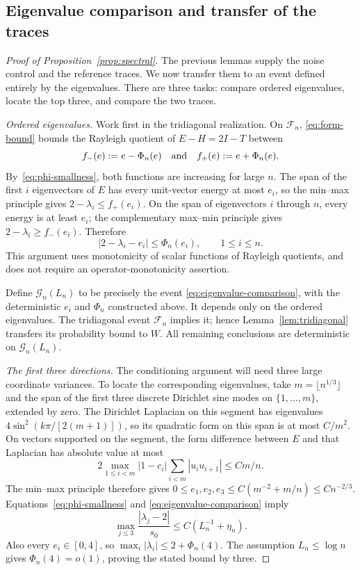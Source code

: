 \subsection{Eigenvalue comparison and transfer of the traces}

\begin{proof}[Proof of Proposition~\ref{prop:spectral}]
The previous lemmas supply the noise control and the reference traces.
We now transfer them to an event defined entirely by the eigenvalues.
There are three tasks: compare ordered eigenvalues, locate the top three,
and compare the two traces.

\smallskip\noindent\emph{Ordered eigenvalues.}
Work first in the tridiagonal realization. On $\mathcal F_n$,
\eqref{eq:form-bound} bounds the Rayleigh quotient of $E-H=2I-T$ between
\[
 f_-(e):=e-\Phi_n(e)\quad\hbox{and}\quad f_+(e):=e+\Phi_n(e).
\]
By~\eqref{eq:phi-smallness}, both functions are increasing for large $n$.
The span of the first $i$ eigenvectors of $E$ has every unit-vector
energy at most $e_i$, so the min--max principle gives
$2-\lambda_i\le f_+(e_i)$.  On the span of eigenvectors $i$ through
$n$, every energy is at least $e_i$; the complementary max--min
principle gives $2-\lambda_i\ge f_-(e_i)$.  Therefore
\begin{equation}
 |2-\lambda_i-e_i|\le\Phi_n(e_i),\qquad 1\le i\le n.
 \label{eq:eigenvalue-comparison}
\end{equation}
This argument uses monotonicity of scalar functions of Rayleigh
quotients, and does not require an operator-monotonicity assertion.

Define $\mathcal G_n(L_n)$ to be precisely the event
\eqref{eq:eigenvalue-comparison}, with the deterministic $e_i$ and
$\Phi_n$ constructed above.  It depends only on the ordered eigenvalues.
The tridiagonal event $\mathcal F_n$ implies it; hence
Lemma~\ref{lem:tridiagonal} transfers its probability bound to $W$.
All remaining conclusions are deterministic on $\mathcal G_n(L_n)$.

\smallskip\noindent\emph{The first three directions.}
The conditioning argument will need three large coordinate variances.
To locate the corresponding eigenvalues, take
$m=\lfloor n^{1/3}\rfloor$ and the span of the first three discrete
Dirichlet sine modes on $\{1,\ldots,m\}$, extended by zero.
The Dirichlet Laplacian on this segment has eigenvalues
$4\sin^2(k\pi/[2(m+1)])$, so its quadratic form on this span is at most
$C/m^2$.  On vectors supported on the segment, the form difference
between $E$ and that Laplacian has absolute value at most
\[
 2\max_{1\le i<m}|1-c_i|\sum_{i<m}|u_iu_{i+1}|
 \le Cm/n.
\]
The min--max principle therefore gives
$0\le e_1,e_2,e_3\le C(m^{-2}+m/n)\le Cn^{-2/3}$.
Equations~\eqref{eq:phi-smallness} and
\eqref{eq:eigenvalue-comparison} imply
\[
 \max_{j\le3}\frac{|\lambda_j-2|}{s_0}
 \le C(L_n^{-1}+\eta_n).
\]
Also every $e_i\in[0,4]$, so
$\max_i|\lambda_i|\le2+\Phi_n(4)$.  The assumption $L_n\le\log n$
gives $\Phi_n(4)=o(1)$, proving the stated bound by three.


\end{proof}
